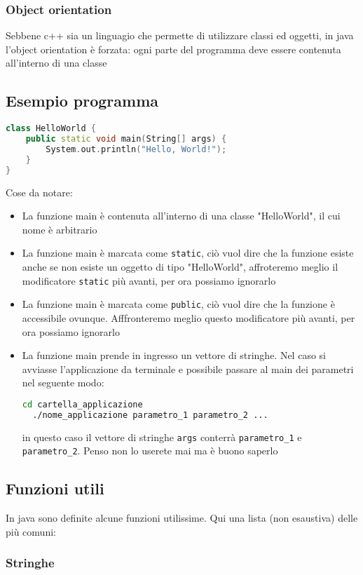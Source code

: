 \subsubsection{Object orientation}
Sebbene c++ sia un linguagio che permette di utilizzare classi ed oggetti, in java l'object orientation è forzata: ogni parte del programma deve essere contenuta all'interno di una classe

\subsection{Esempio programma}
\begin{lstlisting}[language = c++, frame = none]
class HelloWorld {
    public static void main(String[] args) {
        System.out.println("Hello, World!"); 
    }
}
\end{lstlisting}

Cose da notare:
\begin{itemize}
	\item La funzione main è contenuta all'interno di una classe "HelloWorld", il cui nome è arbitrario
	\item La funzione main è marcata come \verb|static|, ciò vuol dire che la funzione esiste anche se non esiste un oggetto di tipo "HelloWorld", affroteremo meglio il modificatore \verb|static| più avanti, per ora possiamo ignorarlo
	\item La funzione main è marcata come \verb|public|, ciò vuol dire che la funzione è accessibile ovunque. Afffronteremo meglio questo modificatore più avanti, per ora possiamo ignorarlo
	\item La funzione main prende in ingresso un vettore di stringhe. Nel caso si avviasse l'applicazione da terminale e possibile passare al main dei parametri nel seguente modo:
	      \begin{lstlisting}[language = bash, frame = none]
  cd cartella_applicazione 
  ./nome_applicazione parametro_1 parametro_2 ... \end{lstlisting}
	      in questo caso il vettore di stringhe \verb|args| conterrà \verb|parametro_1| e \verb|parametro_2|. Penso non lo userete mai ma è buono saperlo
\end{itemize}
\subsection{Funzioni utili}
In java sono definite alcune funzioni utilissime. Qui una lista (non esaustiva) delle più comuni:
\subsubsection{Stringhe}

